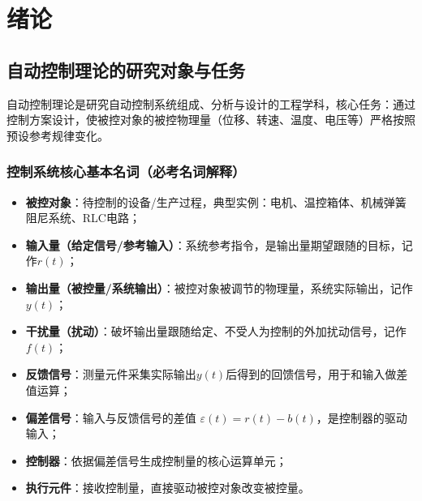\chapter{绪论}

\setlength{\parskip}{0.8ex plus 0.3ex minus 0.2ex}   %
\renewcommand{\arraystretch}{1.5}      %
\setlength{\tabcolsep}{10pt}           %
\addtolength{\abovedisplayskip}{2pt}   %
\addtolength{\belowdisplayskip}{2pt}   %

\bigskip  %

\section{自动控制理论的研究对象与任务}
自动控制理论是研究自动控制系统组成、分析与设计的工程学科，核心任务：通过控制方案设计，使被控对象的被控物理量（位移、转速、温度、电压等）严格按照预设参考规律变化。

\subsection{控制系统核心基本名词（必考名词解释）}
\begin{itemize}
    \item \textbf{被控对象}：待控制的设备/生产过程，典型实例：电机、温控箱体、机械弹簧阻尼系统、RLC电路；
    \item \textbf{输入量（给定信号/参考输入）}：系统参考指令，是输出量期望跟随的目标，记作$r(t)$；
    \item \textbf{输出量（被控量/系统输出）}：被控对象被调节的物理量，系统实际输出，记作$y(t)$；
    \item \textbf{干扰量（扰动）}：破坏输出量跟随给定、不受人为控制的外加扰动信号，记作$f(t)$；
    \item \textbf{反馈信号}：测量元件采集实际输出$y(t)$后得到的回馈信号，用于和输入做差值运算；
    \item \textbf{偏差信号}：输入与反馈信号的差值 $\varepsilon(t)=r(t)-b(t)$，是控制器的驱动输入；
    \item \textbf{控制器}：依据偏差信号生成控制量的核心运算单元；
    \item \textbf{执行元件}：接收控制量，直接驱动被控对象改变被控量。
\end{itemize}

